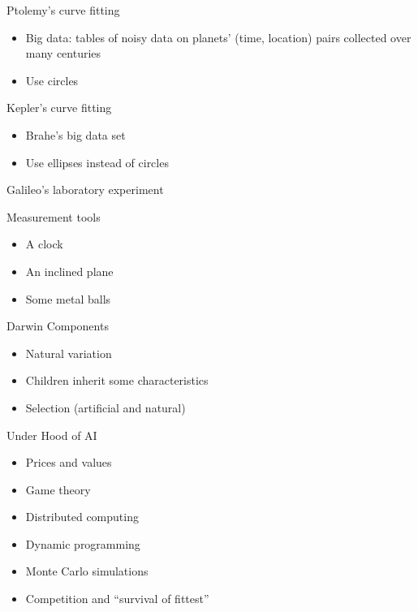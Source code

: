 \documentclass[aspectratio=169]{beamer}
\theoremstyle{Definition}
\begin{document}
\begin{frame}{Ptolemy's curve fitting}
\begin{itemize}
\item Big data: tables of noisy data on planets' (time, location) pairs  collected over many centuries
\item Use circles
\end{itemize}


\end{frame}

\begin{frame}{Kepler's curve fitting}
\begin{itemize}
\item Brahe's big data set
\item Use ellipses instead of circles
\end{itemize}
\end{frame}

\begin{frame}{Galileo's laboratory experiment}

Measurement tools
\begin{itemize}
\item A clock
\item An inclined plane
\item Some metal balls
\end{itemize}

\end{frame}

\begin{frame}{Darwin}
Components
\begin{itemize}
\item Natural variation
\item Children inherit some characteristics
\item Selection (artificial and natural)


\end{itemize}

\end{frame}


\begin{frame}{Under Hood of AI}

\begin{itemize}
\item Prices and values
\item Game theory
\item Distributed computing
\item Dynamic programming
\item Monte Carlo simulations
\item Competition and ``survival of fittest''

\end{itemize}


\end{frame}
\end{document}
